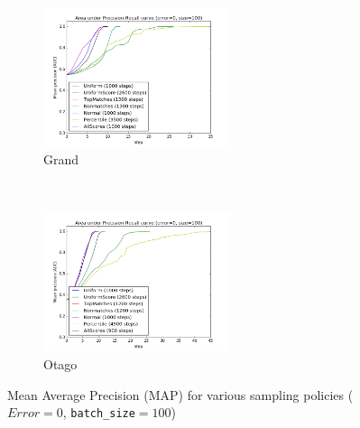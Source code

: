 \begin{figure}[htbp]
  \centering
  \begin{subfigure}[t]{\textwidth}
      \centering
      \includegraphics[width=0.6\textwidth]{policies/grand}
      \caption{Grand}
  \end{subfigure}%
  ~\\
  \begin{subfigure}[t]{\textwidth}
      \centering
      \includegraphics[width=0.6\textwidth]{policies/otago}
      \caption{Otago}
  \end{subfigure}%
  \captionsetup{justification=centering}
  \caption{Mean Average Precision (MAP) for various sampling policies ($Error=0$, \texttt{batch\_size}$=100$)}
\end{figure}

